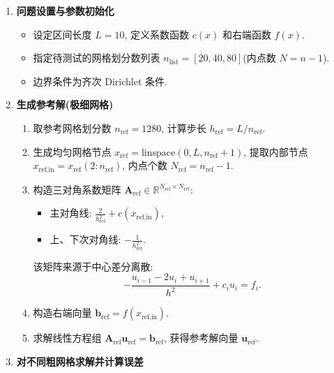 \documentclass[zihao=-4,a4paper]{ctexart}
\begin{document}
\begin{enumerate}[label=\textbf{\arabic*.}, leftmargin=1cm, rightmargin=0.5cm]

    \item \textbf{问题设置与参数初始化}
    \begin{itemize}
        \item 设定区间长度 $L = 10$, 定义系数函数 $c(x)$ 和右端函数 $f(x)$. 
        \item 指定待测试的网格划分数列表 $n_{\text{list}} = [20, 40, 80]$(内点数 $N = n-1$). 
        \item 边界条件为齐次 Dirichlet 条件. 
    \end{itemize}

    \item \textbf{生成参考解(极细网格)}
    \begin{enumerate}[label=(\arabic*)]
        \item 取参考网格划分数 $n_{\text{ref}} = 1280$, 计算步长 $h_{\text{ref}} = L/n_{\text{ref}}$. 
        \item 生成均匀网格节点 $x_{\text{ref}} = \text{linspace}(0, L, n_{\text{ref}}+1)$, 提取内部节点
        $x_{\text{ref,in}} = x_{\text{ref}}(2:n_{\text{ref}})$, 内点个数 $N_{\text{ref}} = n_{\text{ref}}-1$. 
        \item 构造三对角系数矩阵 $\bm{A}_{\text{ref}} \in \mathbb{R}^{N_{\text{ref}} \times N_{\text{ref}}}$: 
        \begin{itemize}
            \item 主对角线: $\displaystyle \frac{2}{h_{\text{ref}}^2} + c(x_{\text{ref,in}})$, 
            \item 上、下次对角线: $\displaystyle -\frac{1}{h_{\text{ref}}^2}$. 
        \end{itemize}
        该矩阵来源于中心差分离散: 
        \[
        -\frac{u_{i-1} - 2u_i + u_{i+1}}{h^2} + c_i u_i = f_i.
        \]
        \item 构造右端向量 $\bm{b}_{\text{ref}} = f(x_{\text{ref,in}})$. 
        \item 求解线性方程组 $\bm{A}_{\text{ref}} \bm{u}_{\text{ref}} = \bm{b}_{\text{ref}}$, 获得参考解向量 $\bm{u}_{\text{ref}}$. 
    \end{enumerate}

    \item \textbf{对不同粗网格求解并计算误差}
    

\end{enumerate}
\end{document}
